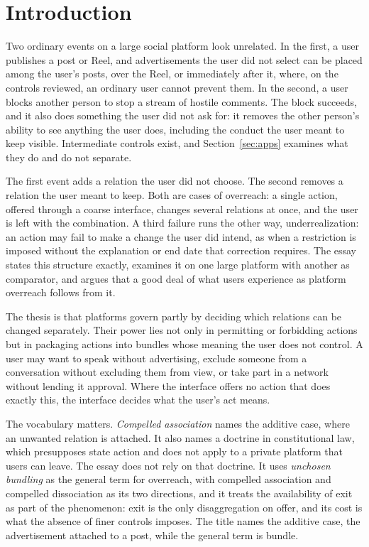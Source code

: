 
\section{Introduction}

Two ordinary events on a large social platform look unrelated. In the first, a user publishes a post or Reel, and advertisements the user did not select can be placed among the user's posts, over the Reel, or immediately after it, where, on the controls reviewed, an ordinary user cannot prevent them. In the second, a user blocks another person to stop a stream of hostile comments. The block succeeds, and it also does something the user did not ask for: it removes the other person's ability to see anything the user does, including the conduct the user meant to keep visible. Intermediate controls exist, and Section~\ref{sec:apps} examines what they do and do not separate.

The first event adds a relation the user did not choose. The second removes a relation the user meant to keep. Both are cases of overreach: a single action, offered through a coarse interface, changes several relations at once, and the user is left with the combination. A third failure runs the other way, underrealization: an action may fail to make a change the user did intend, as when a restriction is imposed without the explanation or end date that correction requires. The essay states this structure exactly, examines it on one large platform with another as comparator, and argues that a good deal of what users experience as platform overreach follows from it.

The thesis is that platforms govern partly by deciding which relations can be changed separately. Their power lies not only in permitting or forbidding actions but in packaging actions into bundles whose meaning the user does not control. A user may want to speak without advertising, exclude someone from a conversation without excluding them from view, or take part in a network without lending it approval. Where the interface offers no action that does exactly this, the interface decides what the user's act means.

The vocabulary matters. \emph{Compelled association} names the additive case, where an unwanted relation is attached. It also names a doctrine in constitutional law, which presupposes state action and does not apply to a private platform that users can leave. The essay does not rely on that doctrine. It uses \emph{unchosen bundling} as the general term for overreach, with compelled association and compelled dissociation as its two directions, and it treats the availability of exit as part of the phenomenon: exit is the only disaggregation on offer, and its cost is what the absence of finer controls imposes. The title names the additive case, the advertisement attached to a post, while the general term is bundle.

